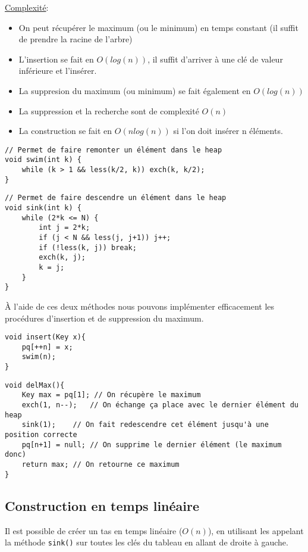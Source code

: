 \documentclass[10pt]{article}
\begin{document}
\underline{Complexité}:
\begin{itemize}
\item On peut récupérer le maximum (ou le minimum) en temps constant (il suffit de prendre la racine de l'arbre)
\item L'insertion se fait en $O(log(n))$, il suffit d'arriver à une clé de valeur inférieure et l'insérer.
\item La suppresion du maximum (ou minimum) se fait également en $O(log(n))$
\item La suppression et la recherche sont de complexité $O(n)$
\item La construction se fait en $O(nlog(n))$ si l'on doit insérer n éléments.
\end{itemize} 

\begin{verbatim}
// Permet de faire remonter un élément dans le heap
void swim(int k) {
	while (k > 1 && less(k/2, k)) exch(k, k/2);
}
\end{verbatim}


\begin{verbatim}
// Permet de faire descendre un élément dans le heap
void sink(int k) {
	while (2*k <= N) {
		int j = 2*k;
		if (j < N && less(j, j+1)) j++;
		if (!less(k, j)) break;
		exch(k, j);
		k = j;	
	}
}
\end{verbatim}

À l'aide de ces deux méthodes nous pouvons implémenter efficacement les procédures d'insertion et de suppression du maximum.

\begin{verbatim}
void insert(Key x){
	pq[++n] = x;
	swim(n);
}
\end{verbatim}

\begin{verbatim}
void delMax(){
	Key max = pq[1]; // On récupère le maximum
	exch(1, n--);	// On échange ça place avec le dernier élément du heap
	sink(1);	// On fait redescendre cet élément jusqu'à une position correcte
	pq[n+1] = null; // On supprime le dernier élément (le maximum donc)
	return max; // On retourne ce maximum
}
\end{verbatim}

\subsection{Construction en temps linéaire}
Il est possible de créer un tas en temps linéaire ($O(n)$), en utilisant les appelant la méthode \verb|sink()| sur toutes les clés du tableau en allant de droite à gauche. 
\end{document}
